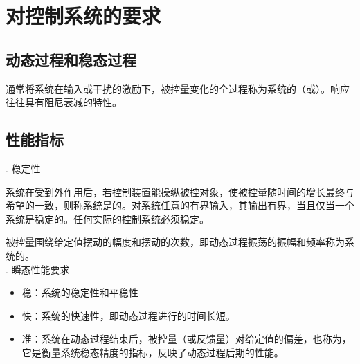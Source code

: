 \section{对控制系统的要求}
\subsection{动态过程和稳态过程}
{
\tdefination[动态过程]
通常将系统在输入或干扰的激励下，被控量变化的全过程称为系统的（或）。响应往往具有阻尼衰减的特性。
}

\subsection{性能指标}
. 稳定性

系统在受到外作用后，若控制装置能操纵被控对象，使被控量随时间的增长最终与希望的一致，则称系统是的。对系统任意的有界输入，其输出有界，当且仅当一个系统是稳定的。任何实际的控制系统必须稳定。

被控量围绕给定值摆动的幅度和摆动的次数，即动态过程振荡的振幅和频率称为系统的。\\

. 瞬态性能要求
\begin{itemize}
	\item 稳：系统的稳定性和平稳性
	\item 快：系统的快速性，即动态过程进行的时间长短。
	\item 准：系统在动态过程结束后，被控量（或反馈量）对给定值的偏差，也称为，它是衡量系统稳态精度的指标，反映了动态过程后期的性能。
\end{itemize}




